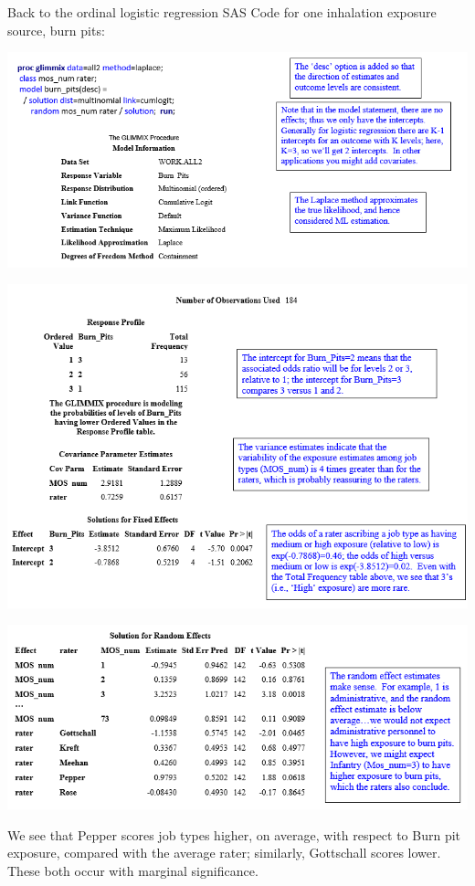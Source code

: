\documentclass[
  9pt,
  ignorenonframetext,
]{beamer}
\begin{document}
\begin{frame}{Back to the ordinal logistic regression}
\protect\hypertarget{back-to-the-ordinal-logistic-regression}{}
SAS Code for one inhalation exposure source, burn pits:

\begin{center}\includegraphics[width=0.8\linewidth]{figs_L17/f1} \end{center}
\end{frame}

\begin{frame}{}
\protect\hypertarget{section-2}{}
\begin{center}\includegraphics[width=0.8\linewidth]{figs_L17/f2} \end{center}
\end{frame}

\begin{frame}{}
\protect\hypertarget{section-3}{}
\begin{center}\includegraphics[width=0.6\linewidth]{figs_L17/f3} \end{center}

We see that Pepper scores job types higher, on average, with respect to
Burn pit exposure, compared with the average rater; similarly,
Gottschall scores lower. These both occur with marginal significance.
\end{frame}
\end{document}
